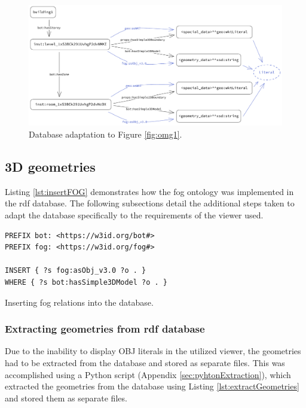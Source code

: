 \begin{figure}[H]
    \centering
    \includegraphics[width=\textwidth]{figures/pdf/dbadaptation.pdf}
    \caption[Database adaptation]{Database adaptation to Figure \ref{fig:omg1}.}
    \label{fig:dbadaptation}
\end{figure}

\subsection{3D geometries}
Listing \ref{lst:insertFOG} demonstrates how the \ac{fog} ontology was implemented in the \ac{rdf} database. The following subsections detail the additional steps taken to adapt the database specifically to the requirements of the viewer used.

\begin{listing}[H]
    \begin{verbatim}
PREFIX bot: <https://w3id.org/bot#>
PREFIX fog: <https://w3id.org/fog#>

INSERT { ?s fog:asObj_v3.0 ?o . }
WHERE { ?s bot:hasSimple3DModel ?o . }
    \end{verbatim}
    \caption[Inserting \acs{fog} relations]{Inserting \acs{fog} relations into the database.}
    \label{lst:insertFOG}
\end{listing}

\subsubsection{Extracting geometries from \ac{rdf} database}
Due to the inability to display OBJ literals in the utilized viewer, the geometries had to be extracted from the database and stored as separate files. This was accomplished using a Python script (Appendix \ref{sec:pyhtonExtraction}), which extracted the geometries from the database using Listing \ref{lst:extractGeometries} and stored them as separate files.

